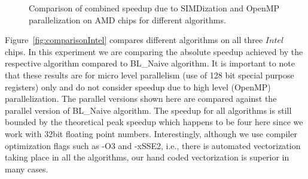 \documentclass{IEEEtran}
\begin{document}
\begin{figure} 
\begin{centering} 
\end{centering}
\caption{Comparison of combined speedup due to SIMDization and OpenMP parallelization on AMD chips for different algorithms.} 
\label{fig:comparisonFinalAMD} 
\end{figure} 


Figure~\ref{fig:comparisonIntel} compares different algorithms on all three $Intel$ chips. In this experiment we are comparing the absolute speedup achieved by the respective algorithm compared to BL\_Naive algorithm. It is important to note that these results are for micro level parallelism (use of 128 bit special purpose registers) only and do not consider speedup due to high level (OpenMP) parallelization. The parallel versions shown here are compared against the parallel version of BL\_Naive algorithm. The speedup for all algorithms is still bounded by the theoretical peak speedup which happens to be four here since we work with 32bit floating point numbers. Interestingly, although we use compiler optimization flags such as -O3 and -xSSE2, i.e., there is automated vectorization taking place in all the algorithms, our hand coded vectorization is superior in many cases.
\end{document}
